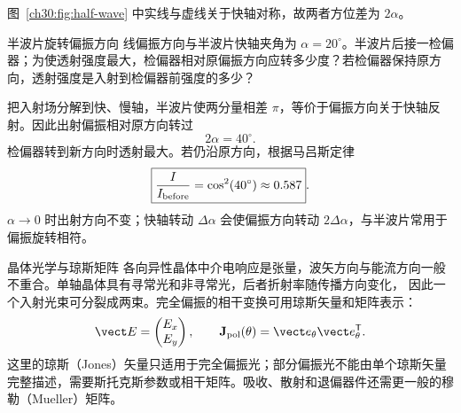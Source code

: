 \begin{center}
\label{ch30:fig:half-wave}
\end{center}
图~\ref{ch30:fig:half-wave} 中实线与虚线关于快轴对称，故两者方位差为 $2\alpha$。

\begin{origexamplebox}{半波片旋转偏振方向}
线偏振方向与半波片快轴夹角为 $\alpha=20^\circ$。半波片后接一检偏器；为使透射强度最大，检偏器相对原偏振方向应转多少度？若检偏器保持原方向，透射强度是入射到检偏器前强度的多少？
\end{origexamplebox}
\begin{xesolution}
把入射场分解到快、慢轴，半波片使两分量相差 $\pi$，等价于偏振方向关于快轴反射。因此出射偏振相对原方向转过
\[
 2\alpha=\boxed{40^\circ}.
\]
检偏器转到新方向时透射最大。若仍沿原方向，根据马吕斯定律
\[
 \boxed{\frac I{I_{\rm before}}=\cos^2(40^\circ)\approx0.587}.
\]
$\alpha\to0$ 时出射方向不变；快轴转动 $\Delta\alpha$ 会使偏振方向转动 $2\Delta\alpha$，与半波片常用于偏振旋转相符。
\end{xesolution}

\begin{starread}{晶体光学与琼斯矩阵}
各向异性晶体中介电响应是张量，波矢方向与能流方向一般不重合。单轴晶体具有寻常光和非寻常光，后者折射率随传播方向变化，
因此一个入射光束可分裂成两束。完全偏振的相干变换可用琼斯矢量和矩阵表示：
\[
 \vect E=\begin{pmatrix}E_x\\E_y\end{pmatrix},\qquad
 \mathbf J_{\rm pol}(\theta)=\vect e_\theta\vect e_\theta^{\mathsf T}.
\]
这里的琼斯（Jones）矢量只适用于完全偏振光；部分偏振光不能由单个琼斯矢量完整描述，需要斯托克斯参数或相干矩阵。吸收、散射和退偏器件还需更一般的穆勒（Mueller）矩阵。
\end{starread}

